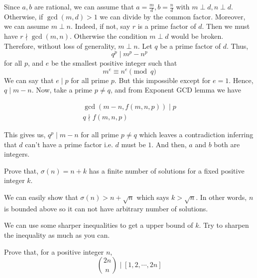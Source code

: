 \documentclass[problems.tex]{subfile}
\begin{document}
	\begin{solution}
		Since $a,b$ are rational, we can assume that $a=\frac{m}{d},b=\frac{n}{d}$ with $m\perp d,n\perp d$. Otherwise, if $\gcd(m,d)>1$ we can divide by the common factor. Moreover, we can assume $m\perp n$. Indeed, if not, say $r$ is a prime factor of $d$. Then we must have $r\nmid\gcd(m,n)$. Otherwise the condition $m\perp d$ would be broken. Therefore, without loss of generality, $m\perp n$. Let $q$ be a prime factor of $d$. Thus, \[q^p\mid m^p-n^p\] for all $p$, and $e$ be the smallest positive integer such that \[m^e\equiv n^e\pmod q\]
		We can say that $e\mid p$ for all prime $p$. But this impossible except for $e=1$. Hence, $q\mid m-n$. Now, take a prime $p\neq q$, and from Exponent GCD lemma we have

		\begin{align*}
			\gcd\left(m-n,f(m,n,p)\right) \mid  p\\
			q\nmid  f(m,n,p)
		\end{align*}



		This gives us, $q^p\mid m-n$ for all prime $p\neq q$ which leaves a contradiction inferring that $d$ can't have a prime factor i.e. $d$ must be $1$. And then, $a$ and $b$ both are integers.
	\end{solution}

	\begin{problem}
		Prove that, $\sigma(n)=n+k$ has a finite number of solutions for a fixed positive integer $k$.
	\end{problem}

	\begin{solution}
		We can easily show that $\sigma(n)>n+\sqrt{n}$ which says $k>\sqrt{n}$. In other words, $n$ is bounded above so it can not have arbitrary number of solutions.
	\end{solution}

	\begin{note}
		We can use some sharper inequalities to get a upper bound of $k$. Try to sharpen the inequality as much as you can.
	\end{note}

	\begin{problem}
		Prove that, for a positive integer $n$, \[\binom{2n}{n}\mid [1,2,\cdots,2n]\]
	\end{problem}
\end{document}
